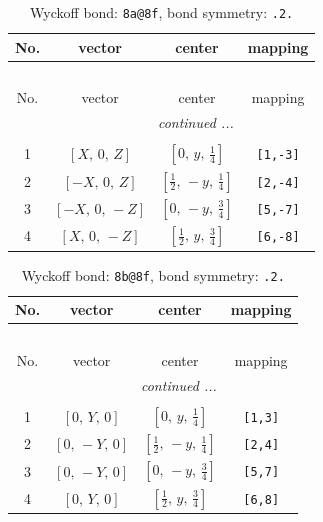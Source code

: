 \documentclass[fleqn,8pt]{jsarticle}
\begin{document}
\begin{longtable}{cccc}
\caption{Wyckoff bond: {\tt 8a@8f}, bond symmetry: {\tt .2.}}
 \\
 \hline \hline
No. & vector & center & mapping \\ \hline \endfirsthead

\multicolumn{3}{l}{\tablename\ \thetable{}} \\
 \hline \hline
No. & vector & center & mapping \\ \hline \endhead

 \hline \hline
\multicolumn{3}{r}{\footnotesize\it continued ...} \\ \endfoot

 \hline \hline
\multicolumn{3}{r}{} \\ \endlastfoot

1 & $\left[ X,\, 0,\, Z \right]$ & $\left[ 0,\, y,\, \frac{1}{4} \right]$ & {\tt [1,-3]} \\ \hline
2 & $\left[ - X,\, 0,\, Z \right]$ & $\left[ \frac{1}{2},\, - y,\, \frac{1}{4} \right]$ & {\tt [2,-4]} \\ \hline
3 & $\left[ - X,\, 0,\, - Z \right]$ & $\left[ 0,\, - y,\, \frac{3}{4} \right]$ & {\tt [5,-7]} \\ \hline
4 & $\left[ X,\, 0,\, - Z \right]$ & $\left[ \frac{1}{2},\, y,\, \frac{3}{4} \right]$ & {\tt [6,-8]} \\
\end{longtable}
\renewcommand{\arraystretch}{1.2}
\begin{longtable}{cccc}
\caption{Wyckoff bond: {\tt 8b@8f}, bond symmetry: {\tt .2.}}
 \\
 \hline \hline
No. & vector & center & mapping \\ \hline \endfirsthead

\multicolumn{3}{l}{\tablename\ \thetable{}} \\
 \hline \hline
No. & vector & center & mapping \\ \hline \endhead

 \hline \hline
\multicolumn{3}{r}{\footnotesize\it continued ...} \\ \endfoot

 \hline \hline
\multicolumn{3}{r}{} \\ \endlastfoot

1 & $\left[ 0,\, Y,\, 0 \right]$ & $\left[ 0,\, y,\, \frac{1}{4} \right]$ & {\tt [1,3]} \\ \hline
2 & $\left[ 0,\, - Y,\, 0 \right]$ & $\left[ \frac{1}{2},\, - y,\, \frac{1}{4} \right]$ & {\tt [2,4]} \\ \hline
3 & $\left[ 0,\, - Y,\, 0 \right]$ & $\left[ 0,\, - y,\, \frac{3}{4} \right]$ & {\tt [5,7]} \\ \hline
4 & $\left[ 0,\, Y,\, 0 \right]$ & $\left[ \frac{1}{2},\, y,\, \frac{3}{4} \right]$ & {\tt [6,8]} \\
\end{longtable}
\end{document}
